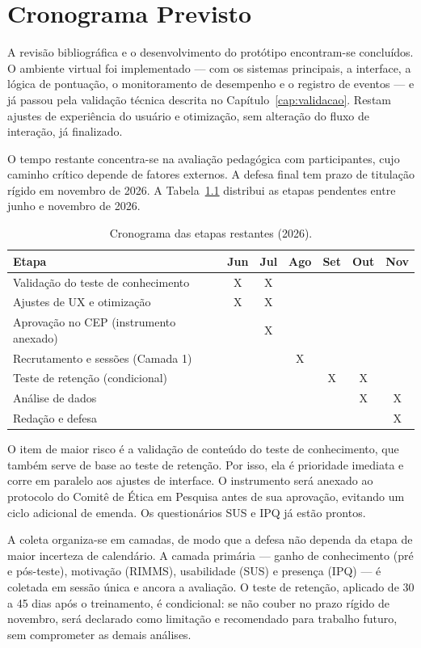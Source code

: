 \chapter{Cronograma Previsto}
\label{cap:cronograma}

A revisão bibliográfica e o desenvolvimento do protótipo encontram-se concluídos. O ambiente virtual foi implementado --- com os sistemas principais, a interface, a lógica de pontuação, o monitoramento de desempenho e o registro de eventos --- e já passou pela validação técnica descrita no Capítulo~\ref{cap:validacao}. Restam ajustes de experiência do usuário e otimização, sem alteração do fluxo de interação, já finalizado.

O tempo restante concentra-se na avaliação pedagógica com participantes, cujo caminho crítico depende de fatores externos. A defesa final tem prazo de titulação rígido em novembro de 2026. A Tabela~\ref{tab:cronograma} distribui as etapas pendentes entre junho e novembro de 2026.

\begin{table}[htb]
\centering
\caption{Cronograma das etapas restantes (2026).}
\label{tab:cronograma}
\begin{tabular}{|l|c|c|c|c|c|c|}
\hline
\textbf{Etapa} & \textbf{Jun} & \textbf{Jul} & \textbf{Ago} & \textbf{Set} & \textbf{Out} & \textbf{Nov} \\
\hline
Validação do teste de conhecimento & X & X & & & & \\
\hline
Ajustes de UX e otimização & X & X & & & & \\
\hline
Aprovação no CEP (instrumento anexado) & & X & & & & \\
\hline
Recrutamento e sessões (Camada 1) & & & X & & & \\
\hline
Teste de retenção (condicional) & & & & X & X & \\
\hline
Análise de dados & & & & & X & X \\
\hline
Redação e defesa & & & & & & X \\
\hline
\end{tabular}
\end{table}

O item de maior risco é a validação de conteúdo do teste de conhecimento, que também serve de base ao teste de retenção. Por isso, ela é prioridade imediata e corre em paralelo aos ajustes de interface. O instrumento será anexado ao protocolo do Comitê de Ética em Pesquisa antes de sua aprovação, evitando um ciclo adicional de emenda. Os questionários SUS e IPQ já estão prontos.

A coleta organiza-se em camadas, de modo que a defesa não dependa da etapa de maior incerteza de calendário. A camada primária --- ganho de conhecimento (pré e pós-teste), motivação (RIMMS), usabilidade (SUS) e presença (IPQ) --- é coletada em sessão única e ancora a avaliação. O teste de retenção, aplicado de 30 a 45 dias após o treinamento, é condicional: se não couber no prazo rígido de novembro, será declarado como limitação e recomendado para trabalho futuro, sem comprometer as demais análises.
